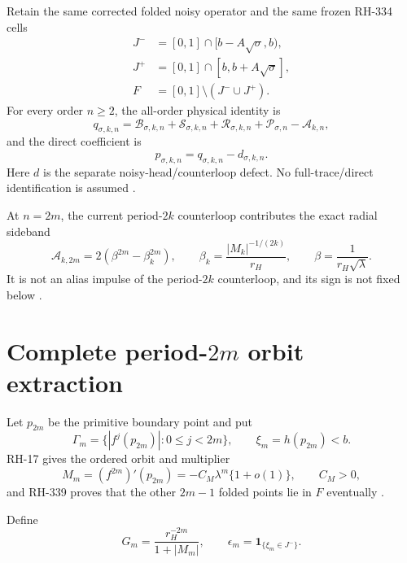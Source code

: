\documentclass[11pt]{article}
\theoremstyle{remark}
\newcommand{\cB}{\mathcal B}
\newcommand{\cS}{\mathcal S}
\newcommand{\cR}{\mathcal R}
\newcommand{\cP}{\mathcal P}
\newcommand{\cA}{\mathcal A}
\newcommand{\one}{\mathbf 1}
\begin{document}
Retain the same corrected folded noisy operator and the same frozen RH-334
cells
\begin{align}
 J^-&=[0,1]\cap[b-A\sqrt\sigma,b),\label{eq:Jminus}\\
 J^+&=[0,1]\cap[b,b+A\sqrt\sigma],\label{eq:Jplus}\\
 F&=[0,1]\setminus(J^-\cup J^+).\label{eq:F}
\end{align}
For every order $n\ge2$, the all-order physical identity is
\begin{equation}\label{eq:five-slot}
 q_{\sigma,k,n}=\cB_{\sigma,k,n}+\cS_{\sigma,k,n}
 +\cR_{\sigma,k,n}+\cP_{\sigma,n}-\cA_{k,n},
\end{equation}
and the direct coefficient is
\begin{equation}\label{eq:direct}
 p_{\sigma,k,n}=q_{\sigma,k,n}-d_{\sigma,k,n}.
\end{equation}
Here $d$ is the separate noisy-head/counterloop defect.  No full-trace/direct
identification is assumed \citep{WangObservation2026,WangSynchronizedPrefix2026}.

At $n=2m$, the current period-$2k$ counterloop contributes the exact radial
sideband
\begin{equation}\label{eq:radial}
 \cA_{k,2m}=2(\beta^{2m}-\beta_k^{2m}),
 \qquad
 \beta_k=\frac{|M_k|^{-1/(2k)}}{r_H},
 \qquad
 \beta=\frac1{r_H\sqrt\lambda}.
\end{equation}
It is not an alias impulse of the period-$2k$ counterloop, and its sign is not
fixed below \citep{WangFirstAlias2026}.

\section{Complete period-$2m$ orbit extraction}

Let $p_{2m}$ be the primitive boundary point and put
\begin{equation}\label{eq:Gamma}
 \Gamma_m=\{|f^j(p_{2m})|:0\le j<2m\},
 \qquad \xi_m=h(p_{2m})<b.
\end{equation}
RH-17 gives the ordered orbit and multiplier
\begin{equation}\label{eq:Mm}
 M_m=(f^{2m})'(p_{2m})=-C_M\lambda^m\{1+o(1)\},
 \qquad C_M>0,
\end{equation}
and RH-339 proves that the other $2m-1$ folded points lie in $F$ eventually
\citep{WangBoundaryMonodromy2026,WangLowerAtom2026}.

Define
\begin{equation}\label{eq:Gm}
 G_m=\frac{r_H^{-2m}}{1+|M_m|},
 \qquad
 \epsilon_m=\one_{\{\xi_m\in J^-\}}.
\end{equation}
\end{document}
